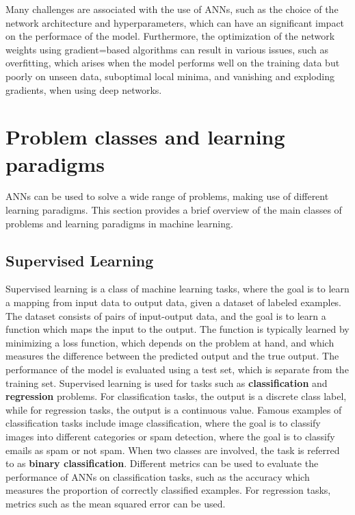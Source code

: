 Many challenges are associated with the use of ANNs, such as the choice of the network architecture and hyperparameters, which can have an significant
impact on the performace of the model. Furthermore, the optimization of the network weights using gradient=based algorithms can result in various issues, such
as overfitting, which arises when the model performs well on the training data but poorly on unseen data, suboptimal local minima, and vanishing and
exploding gradients, when using deep networks.

\section{Problem classes and learning paradigms}

ANNs can be used to solve a wide range of problems, making use of different learning paradigms. This section provides a brief overview of the main classes of
problems and learning paradigms in machine learning.

\subsection{Supervised Learning}

Supervised learning is a class of machine learning tasks, where the goal is to learn a mapping from input data to output data, given a dataset of labeled
examples. The dataset consists of pairs of input-output data, and the goal is to learn a function which maps the input to the output. The function is typically
learned by minimizing a loss function, which depends on the problem at hand, and which measures the difference between the predicted output and the true output.
The performance of the model is evaluated using a test set, which is separate from the training set. Supervised learning is used for tasks such as \textbf{classification}
and \textbf{regression} problems. For classification tasks, the output is a discrete class label, while for regression tasks, the output is a continuous value.
Famous examples of classification tasks include image classification, where the goal is to classify images into different categories or spam detection, where
the goal is to classify emails as spam or not spam. When two classes are involved, the task is referred to as \textbf{binary classification}.
Different metrics can be used to evaluate the performance of ANNs on classification tasks, such as the accuracy which measures the proportion of correctly
classified examples. For regression tasks, metrics such as the mean squared error can be used.

